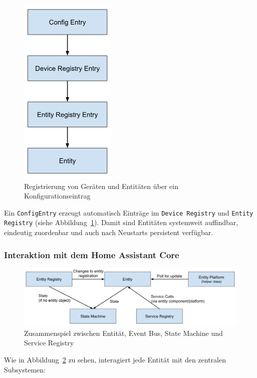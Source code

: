 \begin{figure}[H]
    \centering
    \includegraphics[width=0.35\linewidth]{images/entity_heirarchy.png}
    \caption{Registrierung von Geräten und Entitäten über ein Konfigurationseintrag}
    \label{fig:entity-reg-hierarchy}
\end{figure}

Ein \texttt{ConfigEntry} erzeugt automatisch Einträge im \texttt{Device Registry} und \texttt{Entity Registry} (siehe Abbildung~\ref{fig:entity-reg-hierarchy}). Damit sind Entitäten systemweit auffindbar, eindeutig zuordenbar und auch nach Neustarts persistent verfügbar.

\subsubsection{Interaktion mit dem Home Assistant Core}

\begin{figure}[H]
    \centering
    \includegraphics[width=\linewidth]{images/simp_entity.png}
    \caption{Zusammenspiel zwischen Entität, Event Bus, State Machine und Service Registry}
    \label{fig:entity-core-interaction}
\end{figure}

Wie in Abbildung~\ref{fig:entity-core-interaction} zu sehen, interagiert jede Entität mit den zentralen Subsystemen:

